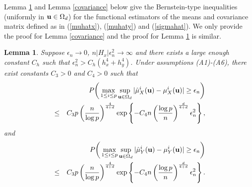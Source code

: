 \documentclass[11pt]{article}
\newtheorem{lem}{Lemma}
\theoremstyle{definition}
\begin{document}
 Lemma \ref{mean} and Lemma \ref{covariance} below give the Bernstein-type inequalities (uniformly in ${\bf u}\in \Omega_d$) for the functional estimators of the means and covariance matrix defined as in (\ref{muhatx}), (\ref{muhaty}) and (\ref{sigmahat}).  We only provide the proof for Lemma \ref{covariance} and the proof for Lemma \ref{mean} is similar.
 
 \begin{lem}\label{mean}
 	Suppose $\epsilon_n\rightarrow 0$, $n|H_x|\epsilon_n^2\rightarrow \infty$ and there exists a large enough constant $C_h$ such that $\epsilon^2_n>C_h(h_x^4+h_y^4)$.  Under assumptions (A1)-(A6), there exist constants $C_3>0$ and $C_4>0$ such that
 	\begin{eqnarray*}
 		&&P\bigg(\max_{1\leq i\leq p}\sup_{{\bf u}\in \Omega_d}|\hat{\mu}_X^i({\bf u})-\mu_X^i({\bf u})|\geq \epsilon_n\bigg)\\
 		&\leq& C_3p\left(\frac{n}{\log p}\right)^{\frac{4}{4+d}}\exp\left\{-C_4n \left(\frac{\log p}{n}\right)^{\frac{d}{4+d}}\epsilon_n^2\right\},
 	\end{eqnarray*}
 	and
 	\begin{eqnarray*}
 		&&P\bigg(\max_{1\leq i\leq p}\sup_{{\bf u}\in \Omega_d}|\hat{\mu}_Y^i({\bf u})-\mu_Y^i({\bf u})|\geq \epsilon_n\bigg)\\
 		&\leq&C_3p\left(\frac{n}{\log p}\right)^{\frac{4}{4+d}}\exp\left\{-C_4n \left(\frac{\log p}{n}\right)^{\frac{d}{4+d}}\epsilon_n^2\right\}.
 	\end{eqnarray*}
 \end{lem}
 
\end{document}
